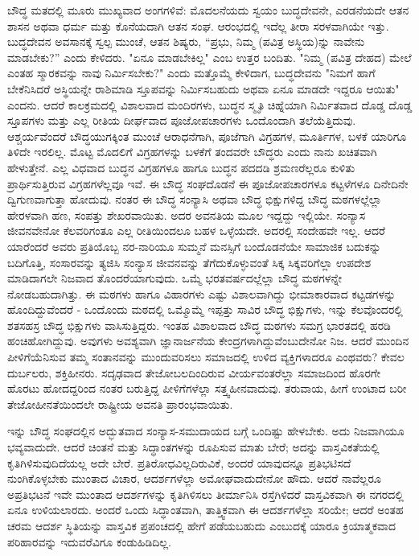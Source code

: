 ಬೌದ್ಧ ಮತದಲ್ಲಿ ಮೂರು ಮುಖ್ಯವಾದ ಅಂಗಗಳಿವೆ: ಮೊದಲನೆಯದು ಸ್ವಯಂ ಬುದ್ಧದೇವನೇ, ಎರಡನೆಯದೇ ಆತನ ಶಾಸನ ಅಥವಾ ಧರ್ಮ ಮತ್ತು ಕೊನೆಯದಾಗಿ ಆತನ ಸಂಘ. ಆರಂಭದಲ್ಲಿ ಇದೆಲ್ಲ ತೀರಾ ಸರಳವಾಗಿಯೇ ಇತ್ತು. ಬುದ್ಧದೇವನ ಅವಸಾನಕ್ಕೆ ಸ್ವಲ್ಪ ಮುಂಚೆ, ಆತನ ಶಿಷ್ಯರು, “ಪ್ರಭು, ನಿಮ್ಮ (ಪವಿತ್ರ ಅಸ್ಥಿಯ)ನ್ನು ನಾವೇನು ಮಾಡಬೇಕು?” ಎಂದು ಕೇಳಿದರು. "ಏನೂ ಮಾಡಬೇಕಿಲ್ಲ" ಎಂಬ ಉತ್ತರ ಬಂದಿತು. "ನಿಮ್ಮ (ಪವಿತ್ರ ದೇಹದ) ಮೇಲೆ ಎಂತಹ ಸ್ಮಾರಕವನ್ನು ನಾವು ನಿರ್ಮಿಸಬೇಕು?" ಎಂದು ಮತ್ತೊಮ್ಮೆ ಕೇಳಿದಾಗ, ಬುದ್ಧದೇವನು "ನಿಮಗೆ ಹಾಗೆ ಬೇಕೆನಿಸಿದರೆ ಅಸ್ಥಿಯನ್ನೇ ರಾಶಿಮಾಡಿ ಸ್ತೂಪವನ್ನು ನಿರ್ಮಿಸಬಹುದು ಅಥವಾ ಏನೂ ಮಾಡದೇ ಇದ್ದರೂ ಆಯಿತು" ಎಂದನು. ಆದರೆ ಕಾಲಕ್ರಮದಲ್ಲಿ ವಿಶಾಲವಾದ ಮಂದಿರಗಳು, ಬುದ್ಧನ ಸ್ಮೃತಿ ಚಿಹ್ನೆಯಾಗಿ ನಿರ್ಮಿತವಾದ ದೊಡ್ಡ ದೊಡ್ಡ ಸ್ತೂಪಗಳು ಮತ್ತು ಎಲ್ಲ ರೀತಿಯ ದೀರ್ಘವಾದ ಪೂಜೋಪಚಾರಗಳು ಒಂದೊಂದಾಗಿ ತಲೆಯೆತ್ತಿದುವು. ಆಶ್ಚರ್ಯವೆಂದರೆ ಬೌದ್ಧಯುಗಕ್ಕಿಂತ ಮುಂಚೆ ಆರಾಧನೆಗಾಗಿ, ಪೂಜೆಗಾಗಿ ವಿಗ್ರಹಗಳ, ಮೂರ್ತಿಗಳ, ಬಳಕೆ ಯಾರಿಗೂ ತಿಳಿದೇ ಇರಲಿಲ್ಲ. ಮೊಟ್ಟ ಮೊದಲಿಗೆ ವಿಗ್ರಹಗಳನ್ನು ಬಳಕೆಗೆ ತಂದವರೇ ಬೌದ್ಧರು ಎಂದು ನಾನು ಖಚಿತವಾಗಿ ಹೇಳುತ್ತೇನೆ. ಎಲ್ಲ ವಿಧವಾದ ಬುದ್ಧನ ವಿಗ್ರಹಗಳೂ ಹಾಗೂ ಬುದ್ಧನ ಪದದಡಿ ಶ್ರಮಣರೆಲ್ಲರೂ ಕುಳಿತು ಪ್ರಾರ್ಥಿಸುತ್ತಿರುವ ವಿಗ್ರಹಗಳೆಲ್ಲವೂ ಇವೆ. ಈ ಬೌದ್ಧ ಸಂಘದೊಡನೆ ಈ ಪೂಜೋಪಚಾರಗಳೂ ಕಟ್ಟಳೆಗಳೂ ದಿನೇದಿನೇ ದ್ವಿಗುಣವಾಗುತ್ತಾ ಹೋದುವು. ನಂತರ ಈ ಬೌದ್ಧ ಸಂನ್ಯಾಸಿ ಅಥವಾ ಬೌದ್ಧ ಭಿಕ್ಷುಗಳಿದ್ದ ಬೌದ್ಧ ಮಠಗಳಲ್ಲೆಲ್ಲಾ ಹೇರಳವಾಗಿ ಹಣ, ಸಂಪತ್ತು ಶೇಖರವಾಯಿತು. ಅದರ ಅವನತಿಯ ಮೂಲ ಇದ್ದದ್ದು ಇಲ್ಲಿಯೇ. ಸಂನ್ಯಾಸ ಜೀವನವೇನೋ ಕೆಲವರಿಗಂತೂ ಎಲ್ಲ ರೀತಿಯಿಂದಲೂ ಬಹಳ ಒಳ್ಳೆಯದೇ. ಅದರಲ್ಲಿ ಸಂದೇಹವೇ ಇಲ್ಲ. ಆದರೆ ಯಾರೆಂದರೆ ಅವರು ಪ್ರತಿಯೊಬ್ಬ ನರ-ನಾರಿಯೂ ಸುಮ್ಮನೆ ಮನಸ್ಸಿಗೆ ಬಂದೊಡನೆಯೇ ಸಾಮಾಜಿಕ ಬದುಕನ್ನು ಬದಿಗೊತ್ತಿ, ಸಂಸಾರವನ್ನು ತ್ಯಜಿಸಿ ಸಂನ್ಯಾಸ ಜೀವನವನ್ನು ತೆಗೆದುಕೊಳ್ಳುವಂತೆ ಸಿಕ್ಕ ಸಿಕ್ಕವರಿಗೆಲ್ಲಾ ಉಪದೇಶ ಮಾಡಿದಾಗಲೇ ನಿಜವಾದ ತೊಂದರೆಯಾಗುವುದು. ಒಮ್ಮೆ ಭರತವರ್ಷದಲ್ಲೆಲ್ಲಾ ಬೌದ್ಧ ಮಠಗಳನ್ನೇ ನೋಡಬಹುದಾಗಿತ್ತು. ಈ ಮಠಗಳು ಹಾಗೂ ವಿಹಾರಗಳು ಎಷ್ಟು ವಿಶಾಲವಾಗಿದ್ದು ಭೀಮಾಕಾರವಾದ ಕಟ್ಟಡಗಳನ್ನು ಹೊಂದಿದ್ದುವೆಂದರೆ - ಒಂದೊಂದು ಮಠದಲ್ಲಿ ಒಮ್ಮೊಮ್ಮೆ ಇಪ್ಪತ್ತು ಸಾವಿರ ಬೌದ್ಧ ಭಿಕ್ಷುಗಳು, ಇನ್ನು ಕೆಲವೊಂದರಲ್ಲಿ ಶತಸಹಸ್ರ ಬೌದ್ಧ ಭಿಕ್ಷುಗಳು ವಾಸಿಸುತ್ತಿದ್ದರು. ಇಂತಹ ವಿಶಾಲವಾದ ಬೌದ್ಧ ಮಠಗಳು ಸಮಗ್ರ ಭಾರತದಲ್ಲಿ ಹರಡಿ ಹಂಚಿಹೋಗಿದ್ದುವು. ಅವುಗಳು ಅವಶ್ಯವಾಗಿ ಜ್ಞಾನಾರ್ಜನೆಯ ಕೇಂದ್ರಗಳಾಗಿದ್ದುವೆಂಬುದೇನೋ ನಿಜ. ಆದರೆ ಮುಂದಿನ ಪೀಳಿಗೆಯೆನಿಸುವ ತಮ್ಮ ಸಂತಾನವನ್ನು ಮುಂದುವರಿಸಲು ಸಮಾಜದಲ್ಲಿ ಉಳಿದ ವ್ಯಕ್ತಿಗಳಾದರೂ ಎಂಥವರು? ಕೇವಲ ದುರ್ಬಲರು, ಶಕ್ತಿಹೀನರು. ಸದೃಢವಾದ ತೇಜೋಬಲದಿಂದಿರುವ ವೀರ್ಯವಂತರೆಲ್ಲಾ ಸಮಾಜದಿಂದ ಹೊರಗೇ ಹೊರಟು ಹೋದದ್ದರಿಂದ ನಂತರ ಬರುತ್ತಿದ್ದ ಪೀಳಿಗೆಗಳೆಲ್ಲಾ ಸತ್ತ್ವಹೀನವಾದುವು. ತರುವಾಯ, ಹೀಗೆ ಉಂಟಾದ ಬರೀ ತೇಜೋಹೀನತೆಯಿಂದಲೇ ರಾಷ್ಟ್ರೀಯ ಅವನತಿ ಪ್ರಾರಂಭವಾಯಿತು.

ಇನ್ನು ಬೌದ್ಧ ಸಂಘದಲ್ಲಿನ ಅದ್ಭುತವಾದ ಸಂನ್ಯಾಸ-ಸಮುದಾಯದ ಬಗ್ಗೆ ಒಂದಿಷ್ಟು ಹೇಳಬೇಕು. ಅದು ನಿಜವಾಗಿಯೂ ಭವ್ಯವಾದುದೇ. ಆದರೆ ಚಿಂತನೆ ಮತ್ತು ಸಿದ್ಧಾಂತಗಳನ್ನು ರೂಪಿಸುವ ಮಾತು ಬೇರೆ; ಅದನ್ನು ವಾಸ್ತವಿಕತೆಯಲ್ಲಿ ಕೃತಿಗಿಳಿಸುವುದಿದೆಯಲ್ಲ ಅದೇ ಬೇರೆ. ಪ್ರತಿರೋಧವಿಲ್ಲದಿರುವಿಕೆ, ಅಂದರೆ ಯಾವುದನ್ನೂ ಪ್ರತಿಭಟಿಸದೆ ನುಂಗಿಕೊಳ್ಳಬೇಕು ಮುಂತಾದ ವಿಚಾರ, ಆದರ್ಶಗಳೆಲ್ಲಾ ಅಮೋಘವಾದುದೇನೋ ಹೌದು. ಆದರೆ ನಾವೆಲ್ಲರೂ ಅಪ್ರತಿಭಟನೆ ಇವೇ ಮುಂತಾದ ಆದರ್ಶಗಳನ್ನು ಕೃತಿಗಿಳಿಸಲು ತೀರ್ಮಾನಿಸಿ ರಸ್ತೆಗಿಳಿದರೆ ವಾಸ್ತವಿಕವಾಗಿ ಈ ನಗರದಲ್ಲಿ ಏನೂ ಉಳಿಯಲಾರದು. ಅಂದರೆ ಒಂದು ಸಿದ್ಧಾಂತವಾಗಿ, ತಾತ್ತ್ವಿಕವಾಗಿ ಈ ಆದರ್ಶಗಳೆಲ್ಲಾ ಸರಿಯೇ; ಆದರೆ ಅಂತಹ ಚರಮ ಆದರ್ಶ ಸ್ಥಿತಿಯನ್ನು ವಾಸ್ತವಿಕ ಪ್ರಪಂಚದಲ್ಲಿ ಹೇಗೆ ಪಡೆಯಬಹುದು ಎಂಬುದಕ್ಕೆ ಯಾರೂ ಕ್ರಿಯಾತ್ಮಕವಾದ ಪರಿಹಾರವನ್ನು ಇದುವರೆವಿಗೂ ಕಂಡುಹಿಡಿದಿಲ್ಲ.

